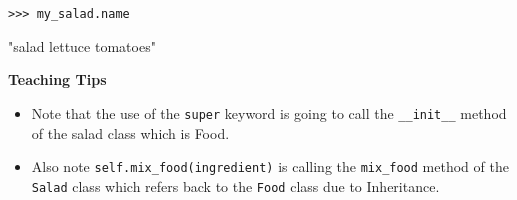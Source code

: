 \begin{lstlisting}
>>> my_salad.name
\end{lstlisting}
\begin{solution}[.3in]
"salad lettuce tomatoes"
\end{solution}

\begin{guide}
\textbf{Teaching Tips}
\begin{itemize}
    \item Note that the use of the \lstinline{super} keyword is going to call the \lstinline{__init__} method of the salad class which is Food.
    \item Also note \lstinline{self.mix_food(ingredient)} is calling the \lstinline{mix_food} method of the \lstinline{Salad} class which refers back to the \lstinline{Food} class due to Inheritance.
\end{itemize}
\end{guide}